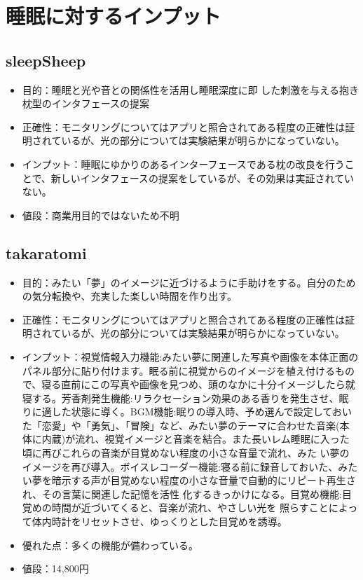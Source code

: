 \section{睡眠に対するインプット}
\subsection{sleepSheep}
\begin{itemize}
\item 目的：睡眠と光や音との関係性を活用し睡眠深度に即 した刺激を与える抱き枕型のインタフェースの提案 \cite{sleepSheep}
\item 正確性：モニタリングについてはアプリと照合されてある程度の正確性は証明されているが、光の部分については実験結果が明らかになっていない。
\item インプット：睡眠にゆかりのあるインターフェースである枕の改良を行うことで、新しいインタフェースの提案をしているが、その効果は実証されていない。
\item 値段：商業用目的ではないため不明
\end{itemize}

\subsection{takaratomi}
\begin{itemize}
\item 目的：みたい「夢」のイメージに近づけるように手助けをする。自分のための気分転換や、充実した楽しい時間を作り出す。 \cite{takaratomi}
\item 正確性：モニタリングについてはアプリと照合されてある程度の正確性は証明されているが、光の部分については実験結果が明らかになっていない。
\item インプット：視覚情報入力機能:みたい夢に関連した写真や画像を本体正面のパネル部分に貼り付けます。眠る前に視覚からのイメージを植え付けるもので、寝る直前にこの写真や画像を見つめ、頭のなかに十分イメージしたら就寝する。芳香剤発生機能:リラクセーション効果のある香りを発生させ、眠 りに適した状態に導く。BGM機能:眠りの導入時、予め選んで設定しておいた「恋愛」や「勇気」、「冒険」など、みたい夢のテーマに合わせた音楽(本体に内蔵)が流れ、視覚イメージと音楽を結合。また長いレム睡眠に入った頃に再びこれらの音楽が目覚めない程度の小さな音量で流れ、みた い夢のイメージを再び導入。ボイスレコーダー機能:寝る前に録音しておいた、みたい夢を暗示する声が目覚めない程度の小さな音量で自動的にリピート再生され、その言葉に関連した記憶を活性 化するきっかけになる。目覚め機能:目覚めの時間が近づいてくると、音楽が流れ、やさしい光を 照らすことによって体内時計をリセットさせ、ゆっくりとした目覚めを誘導。
\item 優れた点：多くの機能が備わっている。
\item 値段：14,800円
\end{itemize}

